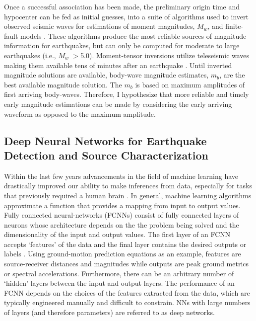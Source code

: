 \documentclass[12p]{article}
\begin{document}
Once a successful association has been made, the preliminary origin time and hypocenter can be fed as initial guesses,
into a suite of algorithms used to invert observed seismic waves for estimations of moment magnitudes, $M_w$, and
finite-fault models \citep{Kanamori2008, Hayes2009, Duputel2012, Ekstrom2012, Hayes2017}. These algorithms produce the
most reliable sources of magnitude information for earthquakes, but can only be computed for moderate to large
earthquakes (i.e., $M_w$ $>$5.0). Moment-tensor inversions utilize teleseismic waves making them available tens of
minutes after an earthquake \citep{Hayes2009, Ekstrom2012}. Until inverted magnitude solutions are available, body-wave
magnitude estimates, $m_b$, are the best available magnitude solution. The $m_b$ is based on maximum amplitudes of first
arriving body-waves. Therefore, I hypothesize that more reliable and timely early magnitude estimations can be made by
considering the early arriving waveform as opposed to the maximum amplitude.

\subsection{Deep Neural Networks for Earthquake Detection and Source Characterization}

Within the last few years advancements in the field of machine learning have drastically improved our ability to make
inferences from data, especially for tasks that previously required a human brain \citep{Lecun2015}. In general,
machine learning algorithms approximate a function that provides a mapping from input to output values. Fully connected
neural-networks (FCNNs) consist of fully connected layers of neurons whose architecture depends on the the problem being
solved and the dimensionality of the input and output values. The first layer of an FCNN accepts `features' of the data
and the final layer contains the desired outputs or labels \citep{Rojas1996}. Using ground-motion prediction equations
as an example, features are source-receiver distances and magnitudes while outputs are peak ground metrics or spectral
accelerations. Furthermore, there can be an arbitrary number of `hidden' layers between the input and output layers. The
performance of an FCNN depends on the choices of the features extracted from the data, which are typically engineered
manually and difficult to constrain. NNs with large numbers of layers (and therefore parameters) are referred to
as deep networks.
\end{document}
